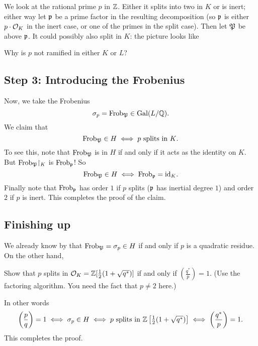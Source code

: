 We look at the rational prime $p$ in $\mathbb Z$.
Either it splits into two in $K$ or is inert; either way let $\mathfrak p$ be a prime factor
in the resulting decomposition (so $\mathfrak p$ is either $p \cdot \mathcal O_K$ in the inert case,
or one of the primes in the split case).
Then let ${\mathfrak P}$ be above $\mathfrak p$.
It could possibly also split in $K$: the picture looks like
\begin{center}
\end{center}
\begin{ques}
	Why is $p$ not ramified in either $K$ or $L$?
\end{ques}

\subsection{Step 3: Introducing the Frobenius}
Now, we take the Frobenius
\[ \sigma_p = \mathrm{Frob}_{\mathfrak P} \in \operatorname{Gal}(L/\mathbb Q). \]
We claim that
\[ \mathrm{Frob}_{\mathfrak P} \in H \iff \text{$p$ splits in $K$}. \]
To see this, note that $\mathrm{Frob}_{\mathfrak P}$ is in $H$ if and only if it acts
as the identity on $K$.
But $\Frob_{\kP} \restrict{K}$ is $\mathrm{Frob}_\mathfrak p$!
So \[ \mathrm{Frob}_{\mathfrak P} \in H \iff \mathrm{Frob}_\mathfrak p = \mathrm{id}_K. \]
Finally note that $\mathrm{Frob}_\mathfrak p$ has order $1$ if $p$ splits
($\mathfrak p$ has inertial degree $1$)
and order $2$ if $p$ is inert.
This completes the proof of the claim.

\subsection{Finishing up}
We already know by  that $\mathrm{Frob}_{\mathfrak P} = \sigma_p \in H$
if and only if $p$ is a quadratic residue.
On the other hand,
\begin{exercise}
	Show that $p$ splits in $\mathcal O_K = \mathbb Z[\frac12(1+\sqrt{q^\ast})]$
	if and only if $\left( \frac{q^\ast}{p} \right) = 1$.
	(Use the factoring algorithm. You need the fact that $p \neq 2$ here.)
\end{exercise}
In other words
\[ \left( \frac pq \right) = 1
	\iff \sigma_p \in H \iff \text{$p$ splits in $\mathbb Z\left[ \tfrac12(1+\sqrt{q^\ast}) \right]$}
	\iff \left( \frac{q^\ast}{p} \right) = 1.
\]
This completes the proof.


